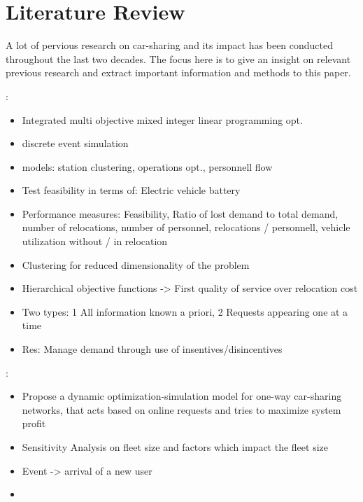 \clearpage
\section{Literature Review}
\label{sec:lr}

A lot of pervious research on car-sharing and its impact has been conducted throughout
the last two decades. The focus here is to give an insight on relevant previous
research and extract important information and methods to this paper.

\cite{OptSimFramework}:
\begin{itemize}
    \item Integrated multi objective mixed integer linear programming opt.
    \item discrete event simulation
    \item models: station clustering, operations opt., personnell flow 
    \item Test feasibility in terms of: Electric vehicle battery
    \item Performance measures: Feasibility, Ratio of lost demand to total demand, number of relocations, number of personnel, relocations / personnell, vehicle utilization without / in relocation
    \item Clustering for reduced dimensionality of the problem 
    \item Hierarchical objective functions -> First quality of service over relocation cost
    \item Two types: 1 All information known a priori, 2 Requests appearing one at a time
    \item Res: Manage demand through use of insentives/disincentives 
\end{itemize}
    
\cite{Nourinejad2014}:
\begin{itemize}
    \item Propose a dynamic optimization-simulation model for one-way car-sharing networks, that acts based on
    online requests and tries to maximize system profit
    \item Sensitivity Analysis on fleet size and factors which impact the fleet size
    \item Event -> arrival of a new user
    \item 
\end{itemize}

